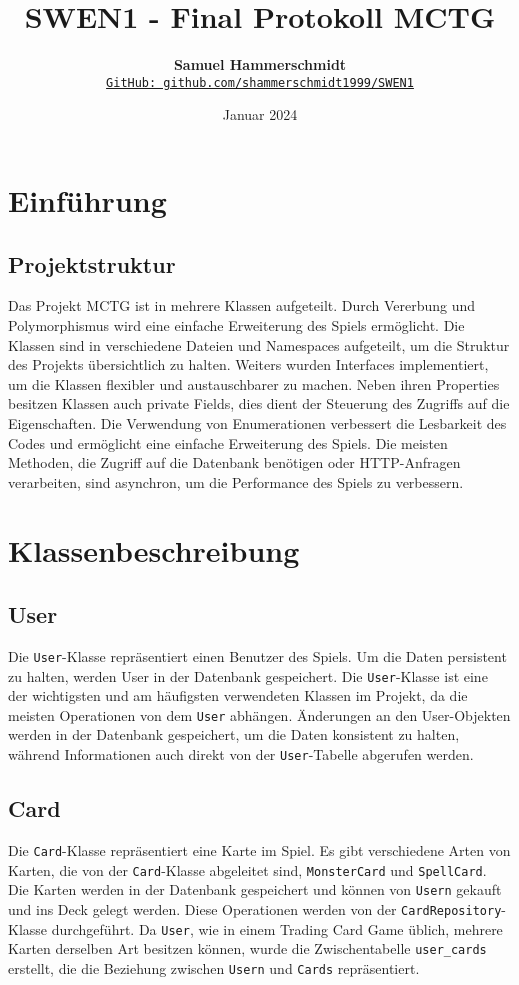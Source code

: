 \documentclass[a4paper, 12pt]{article}
\title{\vspace{-1cm}SWEN1 - Final Protokoll MCTG}
\author{
    \textbf{Samuel Hammerschmidt} \\
    \href{https://github.com/shammerschmidt1999/SWEN1}{\texttt{GitHub: github.com/shammerschmidt1999/SWEN1}}
}
\date{Januar 2024}
\begin{document}
\maketitle

\section{Einführung}
\subsection{Projektstruktur}
Das Projekt MCTG ist in mehrere Klassen aufgeteilt. Durch Vererbung und Polymorphismus wird eine einfache Erweiterung des Spiels ermöglicht.
Die Klassen sind in verschiedene Dateien und Namespaces aufgeteilt, um die Struktur des Projekts übersichtlich zu halten. 
Weiters wurden Interfaces implementiert, um die Klassen flexibler und austauschbarer zu machen.
Neben ihren Properties besitzen Klassen auch private Fields, dies dient der Steuerung des Zugriffs auf die Eigenschaften.
Die Verwendung von Enumerationen verbessert die Lesbarkeit des Codes und ermöglicht eine einfache Erweiterung des Spiels.
Die meisten Methoden, die Zugriff auf die Datenbank benötigen oder HTTP-Anfragen verarbeiten, sind asynchron, um die Performance des Spiels zu verbessern.

\vspace{0.5cm}
\section{Klassenbeschreibung}
\subsection{User}
Die \texttt{User}-Klasse repräsentiert einen Benutzer des Spiels. Um die Daten persistent zu halten, werden User in der Datenbank gespeichert.
Die \texttt{User}-Klasse ist eine der wichtigsten und am häufigsten verwendeten Klassen im Projekt, da die meisten Operationen von dem \texttt{User} abhängen.
Änderungen an den User-Objekten werden in der Datenbank gespeichert, um die Daten konsistent zu halten, während Informationen auch direkt von der \texttt{User}-Tabelle abgerufen werden.

\subsection{Card}
Die \texttt{Card}-Klasse repräsentiert eine Karte im Spiel. Es gibt verschiedene Arten von Karten, die von der \texttt{Card}-Klasse abgeleitet sind, \texttt{MonsterCard} und \texttt{SpellCard}.
Die Karten werden in der Datenbank gespeichert und können von \texttt{Usern} gekauft und ins Deck gelegt werden. Diese Operationen werden von der \texttt{CardRepository}-Klasse durchgeführt.
Da \texttt{User}, wie in einem Trading Card Game üblich, mehrere Karten derselben Art besitzen können, wurde die Zwischentabelle \texttt{user\_cards} erstellt, die die Beziehung zwischen \texttt{Usern} und \texttt{Cards} repräsentiert.
\end{document}
